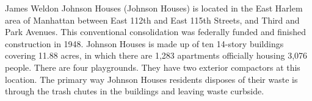 James Weldon Johnson Houses (Johnson Houses) is located in the East Harlem area of Manhattan between East 112th and East  115th Streets, and Third and Park Avenues. This conventional consolidation was federally funded and finished construction in 1948. Johnson Houses is made up of ten 14-story buildings covering 11.88 acres, in which there are 1,283 apartments officially housing 3,076 people. There are four playgrounds. They have two exterior compactors at this location. The primary way Johnson Houses residents disposes of their waste is through the trash chutes in the buildings and leaving waste curbside.
